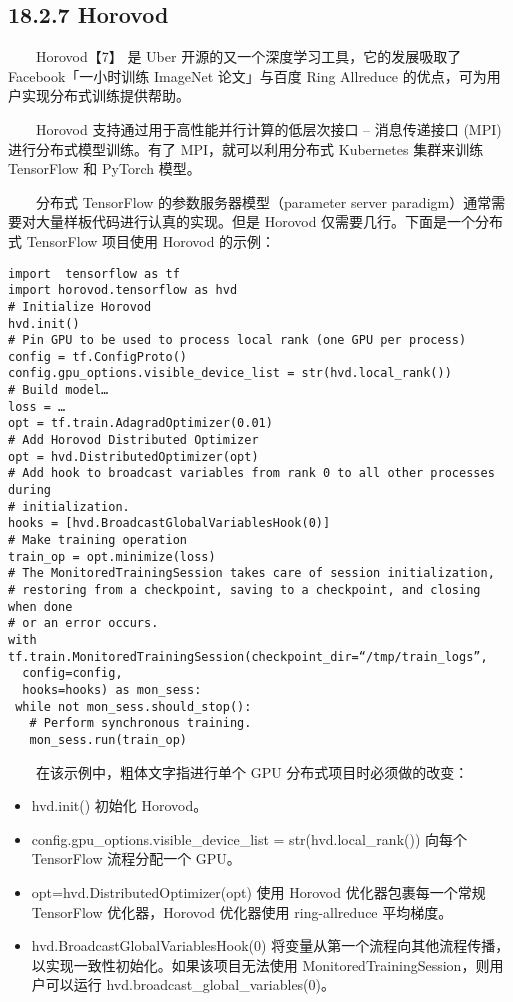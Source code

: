 \subsection{18.2.7 Horovod}\label{horovod}

  Horovod【7】 是 Uber 开源的又一个深度学习工具，它的发展吸取了
Facebook「一小时训练 ImageNet 论文」与百度 Ring Allreduce
的优点，可为用户实现分布式训练提供帮助。

  Horovod 支持通过用于高性能并行计算的低层次接口 -- 消息传递接口 (MPI)
进行分布式模型训练。有了 MPI，就可以利用分布式 Kubernetes 集群来训练
TensorFlow 和 PyTorch 模型。

  分布式 TensorFlow 的参数服务器模型（parameter server
paradigm）通常需要对大量样板代码进行认真的实现。但是 Horovod
仅需要几行。下面是一个分布式 TensorFlow 项目使用 Horovod 的示例：

\begin{verbatim}
import  tensorflow as tf
import horovod.tensorflow as hvd
# Initialize Horovod
hvd.init()
# Pin GPU to be used to process local rank (one GPU per process)
config = tf.ConfigProto()
config.gpu_options.visible_device_list = str(hvd.local_rank())
# Build model…
loss = …
opt = tf.train.AdagradOptimizer(0.01)
# Add Horovod Distributed Optimizer
opt = hvd.DistributedOptimizer(opt)
# Add hook to broadcast variables from rank 0 to all other processes during
# initialization.
hooks = [hvd.BroadcastGlobalVariablesHook(0)]
# Make training operation
train_op = opt.minimize(loss)
# The MonitoredTrainingSession takes care of session initialization,
# restoring from a checkpoint, saving to a checkpoint, and closing when done
# or an error occurs.
with tf.train.MonitoredTrainingSession(checkpoint_dir=“/tmp/train_logs”,
  config=config,
  hooks=hooks) as mon_sess:
 while not mon_sess.should_stop():
   # Perform synchronous training.
   mon_sess.run(train_op)
\end{verbatim}

  在该示例中，粗体文字指进行单个 GPU 分布式项目时必须做的改变：

\begin{itemize}
\item
  hvd.init() 初始化 Horovod。
\item
  config.gpu\_options.visible\_device\_list = str(hvd.local\_rank())
  向每个 TensorFlow 流程分配一个 GPU。
\item
  opt=hvd.DistributedOptimizer(opt) 使用 Horovod 优化器包裹每一个常规
  TensorFlow 优化器，Horovod 优化器使用 ring-allreduce 平均梯度。
\item
  hvd.BroadcastGlobalVariablesHook(0)
  将变量从第一个流程向其他流程传播，以实现一致性初始化。如果该项目无法使用
  MonitoredTrainingSession，则用户可以运行
  hvd.broadcast\_global\_variables(0)。
\end{itemize}

